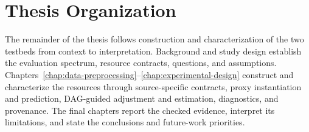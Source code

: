 \section{Thesis Organization}
\label{sec:introduction:thesis-organization}

The remainder of the thesis follows construction and characterization of the two testbeds from context to interpretation.  Background and study design establish the evaluation spectrum, resource contracts, questions, and assumptions.  Chapters~\ref{chap:data-preprocessing}--\ref{chap:experimental-design} construct and characterize the resources through source-specific contracts, proxy instantiation and prediction, DAG-guided adjustment and estimation, diagnostics, and provenance.  The final chapters report the checked evidence, interpret its limitations, and state the conclusions and future-work priorities.
